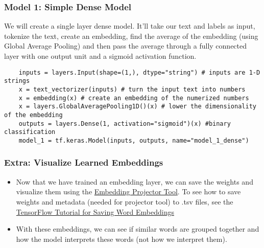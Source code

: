\documentclass[11pt, a4paper]{article}
\begin{document}
	\subsubsection{Model 1: Simple Dense Model}
	We will create a single layer dense model. It'll take our text and labels as input, tokenize the text, create an embedding, find the average of the embedding (using Global Average Pooling) and then pass the average through a fully connected layer with one output unit and a sigmoid activation function.
	\begin{lstlisting}
	inputs = layers.Input(shape=(1,), dtype="string") # inputs are 1-D strings
	x = text_vectorizer(inputs) # turn the input text into numbers
	x = embedding(x) # create an embedding of the numerized numbers
	x = layers.GlobalAveragePooling1D()(x) # lower the dimensionality of the embedding
	outputs = layers.Dense(1, activation="sigmoid")(x) #binary classification
	model_1 = tf.keras.Model(inputs, outputs, name="model_1_dense") \end{lstlisting}

	\subsubsection{Extra: Visualize Learned Embeddings}
	\begin{itemize}
		\item Now that we have trained an embedding layer, we can save the weights and visualize them using the \href{https://projector.tensorflow.org/}{Embedding Projector Tool}. To see how to save weights and metadata (needed for projector tool) to .tsv files, see the \href{https://www.tensorflow.org/text/guide/word\_embeddings#retrieve\_the\_trained\_word\_embeddings\_and\_save\_them\_to\_disk}{TensorFlow Tutorial for Saving Word Embeddings}
		\item With these embeddings, we can see if similar words are grouped together and how the model interprets these words (not how we interpret them).
	\end{itemize} 
\end{document}
